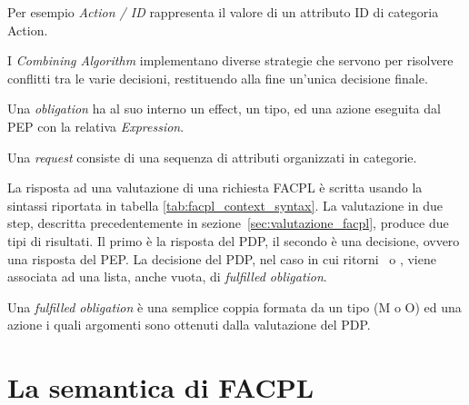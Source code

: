 Per esempio \textit{Action / ID} rappresenta il valore di un attributo ID di categoria Action.\\ \par
I \textit{Combining Algorithm} implementano diverse strategie che servono per risolvere conflitti tra le varie decisioni, restituendo alla fine un'unica decisione finale.\\ \par
Una \textit{obligation} ha al suo interno un effect, un tipo, ed una azione eseguita dal PEP con la relativa \textit{Expression}.\\ \par
Una \textit{request} consiste di una sequenza di attributi organizzati in categorie.\\ \par
La risposta ad una valutazione di una richiesta FACPL è scritta usando la sintassi riportata in tabella \ref{tab:facpl_context_syntax}.
La valutazione in due step, descritta precedentemente in sezione~\ref{sec:valutazione_facpl}, produce due tipi di risultati. Il primo è la risposta del PDP, il secondo è una decisione, ovvero una risposta del PEP.
La decisione del PDP, nel caso in cui ritorni \permit \ o \deny, viene associata ad una lista, anche vuota, di \textit{fulfilled obligation}.\\ \par
Una \textit{fulfilled obligation} è una semplice coppia formata da un tipo (M o O) ed una azione i quali argomenti sono ottenuti dalla valutazione del PDP.

\section{La semantica di FACPL}
\label{sec:semantica_originale}


